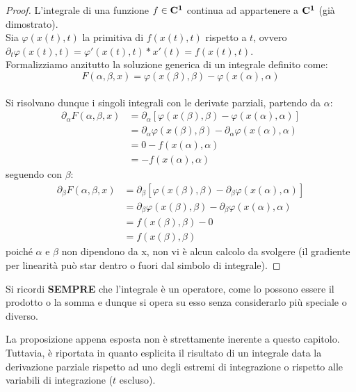 \begin{proof}
	L'integrale di una funzione $ f \in \mathbf{C^{1}} $ continua ad appartenere a $ \mathbf{C^{1}} $ (già dimostrato).\\
	Sia $ \varphi(x(t),t) $ la primitiva di $ f(x(t),t) $ rispetto a $ t $,
	ovvero $ \partial_t \varphi(x(t),t) = \varphi'(x(t),t)*x'(t) = f(x(t),t) $.\\
	Formalizziamo anzitutto la soluzione generica di un integrale definito come:\\
	\[F(\alpha,\beta,x) = \varphi(x(\beta),\beta) - \varphi(x(\alpha),\alpha) \]\\
	Si risolvano dunque i singoli integrali con le derivate parziali, partendo da $ \alpha $:\\
	\begin{align*}
		\partial_\alpha F(\alpha,\beta,x) &= \partial_\alpha \left[\varphi(x(\beta),\beta) - \varphi(x(\alpha),\alpha)\right]\\
		&= \partial_\alpha \varphi(x(\beta),\beta) - \partial_\alpha \varphi(x(\alpha),\alpha)\\
		&= 0 - f(x(\alpha),\alpha)\\
		&= - f(x(\alpha),\alpha)
	\end{align*}
	seguendo con $ \beta $:\\
	\begin{align*}
		\partial_\beta F(\alpha,\beta,x) &= \partial_\beta \left[\varphi(x(\beta),\beta) - \partial_\beta \varphi(x(\alpha),\alpha)\right]\\
		&= \partial_\beta \varphi(x(\beta),\beta) - \partial_\beta \varphi(x(\alpha),\alpha)\\
		&= f(x(\beta),\beta) - 0\\
		&= f(x(\beta),\beta)
	\end{align*}
	poiché $ \alpha $ e $ \beta $ non dipendono da x, non vi è alcun calcolo da svolgere
	(il gradiente per linearità può star dentro o fuori dal simbolo di integrale).
\end{proof}
\begin{note}
	Si ricordi \textbf{SEMPRE} che l'integrale è un operatore, come lo possono essere il prodotto o la somma e dunque si opera su esso
	senza considerarlo più speciale o diverso.
\end{note}
\begin{note}
	La proposizione appena esposta non è strettamente inerente a questo capitolo. Tuttavia, è riportata in quanto esplicita il risultato di un integrale
	data la derivazione parziale rispetto ad uno degli estremi di integrazione o rispetto alle variabili di integrazione ($ t $ escluso). 
\end{note}

